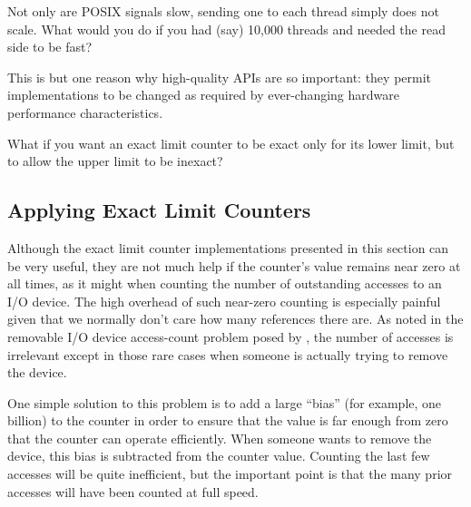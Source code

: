 \QuickQuiz{}
	Not only are POSIX signals slow, sending one to each thread
	simply does not scale.
	What would you do if you had (say) 10,000 threads and needed
	the read side to be fast?
 \QuickQuizEnd

This is but one reason why high-quality APIs are so important:
they permit implementations to be changed as required by ever-changing
hardware performance characteristics.

\QuickQuiz{}
	What if you want an exact limit counter to be exact only for
	its lower limit, but to allow the upper limit to be inexact?
 \QuickQuizEnd

\subsection{Applying Exact Limit Counters}
\label{sec:count:Applying Exact Limit Counters}

Although the exact limit counter implementations presented in this
section can be very useful, they are not much help if the counter's value
remains near zero at all times, as it might when counting the number
of outstanding accesses to an I/O device.
The high overhead of such near-zero counting is especially painful
given that we normally don't care how many references there are.
As noted in the removable I/O device access-count problem posed by
\QuickQuizRef{\QcountQIOcnt},
the number of accesses is irrelevant except in those rare cases when
someone is actually trying to remove the device.

One simple solution to this problem is to add a large ``bias''
(for example, one billion) to the
counter in order to ensure that the value is far enough from zero that
the counter can operate efficiently.
When someone wants to remove the device, this bias is subtracted from
the counter value.
Counting the last few accesses will be quite inefficient,
but the important point is that the many prior accesses will have been
counted at full speed.

